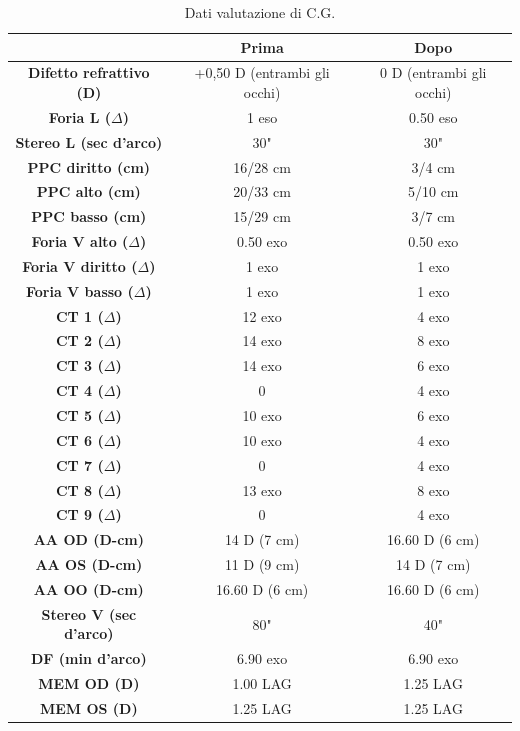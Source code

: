 \begin{table}[H]
\begin{center}
\begin{tabular}{|c|c|c|} \hline
{\textbf{}} & {\textbf{Prima}} & {\textbf{Dopo}}\\ \hline
\textbf{Difetto refrattivo (D)} & +0,50 D (entrambi gli occhi) & 0 D (entrambi gli occhi) \\ \hline
\textbf{Foria L ($\Delta$)} & 1 eso & 0.50 eso \\ \hline
\textbf{Stereo L (sec d'arco)} & 30" & 30" \\ \hline
\textbf{PPC diritto (cm)} & 16/28 cm & 3/4 cm \\ \hline
\textbf{PPC alto (cm)} & 20/33 cm & 5/10 cm \\ \hline
\textbf{PPC basso (cm)} & 15/29 cm & 3/7 cm\\ \hline
\textbf{Foria V alto ($\Delta$)} & 0.50 exo & 0.50 exo \\ \hline
\textbf{Foria V diritto ($\Delta$)} & 1 exo & 1 exo \\ \hline
\textbf{Foria V basso ($\Delta$)} & 1 exo & 1 exo \\ \hline
\textbf{CT 1 ($\Delta$)} & 12 exo & 4 exo \\ \hline
\textbf{CT 2 ($\Delta$)} & 14 exo & 8 exo \\ \hline
\textbf{CT 3 ($\Delta$)} & 14 exo & 6 exo \\ \hline
\textbf{CT 4 ($\Delta$)} & 0 & 4 exo \\ \hline
\textbf{CT 5 ($\Delta$)} & 10 exo & 6 exo \\ \hline
\textbf{CT 6 ($\Delta$)} & 10 exo & 4 exo \\ \hline
\textbf{CT 7 ($\Delta$)} & 0 & 4 exo \\ \hline
\textbf{CT 8 ($\Delta$)} & 13 exo & 8 exo \\ \hline
\textbf{CT 9 ($\Delta$)} & 0 & 4 exo \\ \hline
\textbf{AA OD (D-cm)} & 14 D (7 cm) & 16.60 D (6 cm)\\ \hline
\textbf{AA OS (D-cm)} & 11 D (9 cm) & 14 D (7 cm)\\ \hline
\textbf{AA OO (D-cm)} & 16.60 D (6 cm) & 16.60 D (6 cm) \\ \hline
\textbf{Stereo V (sec d'arco)} & 80" & 40" \\ \hline
\textbf{DF (min d'arco)} & 6.90 exo & 6.90 exo\\ \hline
\textbf{MEM OD (D)} & 1.00 LAG  & 1.25 LAG \\ \hline
\textbf{MEM OS (D)} & 1.25 LAG & 1.25 LAG\\ \hline

\hline
\end{tabular}
\end{center}
\caption{Dati valutazione di C.G.}
\end{table}

